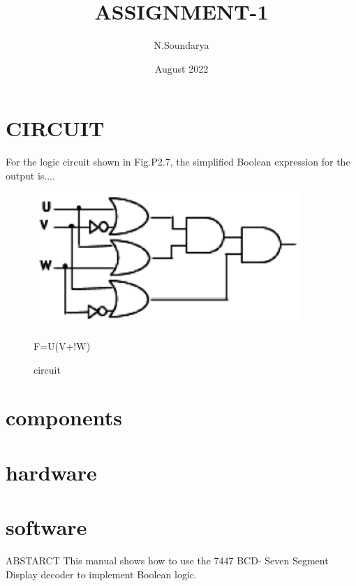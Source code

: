 \documentclass{article}
\title{ASSIGNMENT-1}
\author{N.Soundarya}
\date{August 2022}
\begin{document}
\maketitle

\section{CIRCUIT}

For the logic circuit shown in Fig.P2.7, the simplified Boolean expression for the output is....\\
\begin{figure}
    \centering
    \includegraphics[width=4in]{1.PNG}
    \caption{F=U(V+!W)}
    \caption{circuit}
    \label{fig:circuit}
\end{figure}
\section{components}
\section{hardware}
\section{software}
ABSTARCT This manual shows how to use the 7447 BCD-
Seven Segment Display decoder to implement Boolean logic.
\end{document}

